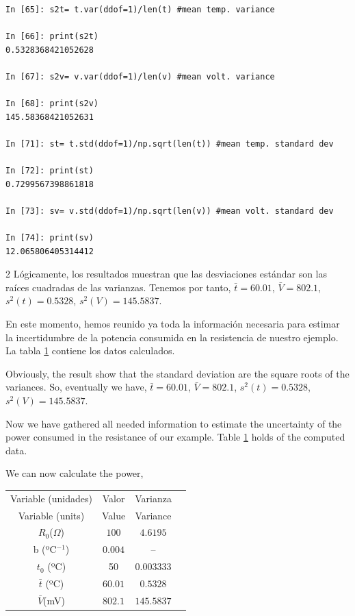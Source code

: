\begin{center}
	\begin{minipage}{\textwidth}
		\begin{verbatim}
In [65]: s2t= t.var(ddof=1)/len(t) #mean temp. variance

In [66]: print(s2t)
0.5328368421052628

In [67]: s2v= v.var(ddof=1)/len(v) #mean volt. variance

In [68]: print(s2v)
145.58368421052631

In [71]: st= t.std(ddof=1)/np.sqrt(len(t)) #mean temp. standard dev

In [72]: print(st)
0.7299567398861818

In [73]: sv= v.std(ddof=1)/np.sqrt(len(v)) #mean volt. standard dev

In [74]: print(sv)
12.065806405314412
		\end{verbatim}
	\end{minipage}
\end{center} 
\begin{paracol}{2}
Lógicamente, los resultados muestran que las desviaciones estándar son las raíces cuadradas de las varianzas. Tenemos por tanto, $\bar{t}=60.01$, $\bar{V}=802.1$, $s^2(t)=0.5328$, $s^2(V)=145.5837$.
 
En este momento, hemos reunido ya toda la información necesaria para estimar la incertidumbre de la potencia consumida en la resistencia de nuestro ejemplo. La tabla \ref{tabdatos} contiene los datos calculados.

\switchcolumn
Obviously, the result show that the standard deviation are the square roots of the variances. So, eventually we have, $\bar{t}=60.01$, $\bar{V}=802.1$, $s^2(t)=0.5328$, $s^2(V)=145.5837$.

Now we have gathered all needed information to estimate the uncertainty of the power consumed in the resistance of our example. Table \ref{tabdatos} holds of the computed data.

We can now calculate the power,
\end{paracol}

\begin{table}[h]
\label{tabdatos}
\centering
\begin{tabular}{cccc}
\hline
Variable (unidades) & Valor & Varianza  \\
Variable (units) & Value & Variance\\ 
\hline
\hline
$R_0$($\Omega$)&$100$&$4.6195$\\
\hline
b (ºC$^{-1}$)& $0.004$ &--\\
\hline
$t_0$ (ºC)& 50& 0.003333\\
\hline 
 $\bar{t}$ (ºC)&$60.01$&$0.5328$\\
\hline 
$\bar{V}$(mV)& $802.1$&$145.5837$\\
\hline
\hline
\end{tabular}
\end{table}


